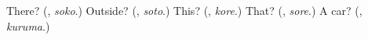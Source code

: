 \begin{tcolorbox}[breakable,colback=teal!4,colframe=teal!35!black,title={Before you move on}]
There? (\textbf{}, \emph{soko}.) Outside? (\textbf{}, \emph{soto}.) This? (\textbf{}, \emph{kore}.) That? (\textbf{}, \emph{sore}.) A car? (\textbf{}, \emph{kuruma}.)
\end{tcolorbox}
